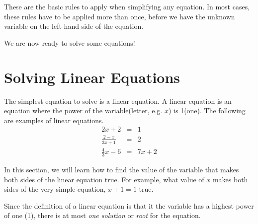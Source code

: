 \documentclass[10pt,a4paper,titlepage,twoside,openright]{report}
\begin{document}
These are the basic rules to apply when simplifying any equation. In most cases, these rules have to be applied more than once, before we have the unknown variable on the left hand side of the equation. 

We are now ready to solve some equations!



\section{Solving Linear Equations}

The simplest equation to solve is a linear equation. A linear equation is an
equation where the power of the variable(letter, e.g. $x$) is 1(one). The
following are examples of linear equations.
\begin{eqnarray*}
2x+2&=&1\\
\frac{2-x}{3x+1}&=&2\\
\frac{4}{3}x-6&=&7x+2
\end{eqnarray*}

In this section, we will learn how to find the value of the variable that makes
both sides of the linear equation true. For example, what value of $x$ makes
both sides of the very simple equation, $x+1=1$ true.

Since the definition of a linear equation is that it the variable has a highest power of one (1), there is
at most  \textit{one solution} or \textit{root} for the equation.
\end{document}
